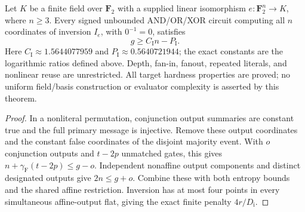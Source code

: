 \begin{theorem}
  \label{thm:lowerbounds-algebraic-geometry-inversion-fiber}
  \leanok
  Let $K$ be a finite field over $\mathbf F_2$ with a supplied linear
  isomorphism $e:\mathbf F_2^n\longrightarrow K$, where $n\ge3$.
  Every signed unbounded AND/OR/XOR circuit computing all $n$ coordinates
  of inversion $I_e$, with $0^{-1}=0$, satisfies
  \[
    g\ge C_{\mathrm I}n-P_{\mathrm I}.
  \]
  Here $C_{\mathrm I}\approx1.5644077959$ and
  $P_{\mathrm I}\approx0.5640721944$; the exact constants are the logarithmic
  ratios defined above. Depth,
  fan-in, fanout, repeated literals, and nonlinear reuse are unrestricted.
  All target hardness properties are proved; no uniform field/basis
  construction or evaluator complexity is asserted by this theorem.
\end{theorem}
\begin{proof}
  \leanok
  In a nonliteral permutation, conjunction output summaries are constant true
  and the full primary message is injective. Remove these output coordinates
  and the constant false coordinates of the disjoint majority event. With $o$
  conjunction outputs and $t-2p$ unmatched gates, this gives
  $n+\gamma_{\mathrm F}(t-2p)\le g-o$. Independent nonaffine output components
  and distinct designated outputs give $2n\le g+o$. Combine these with both
  entropy bounds and the shared affine restriction. Inversion has at most
  four points in every simultaneous affine-output flat, giving the exact
  finite penalty $4r/D_{\mathrm i}$.
\end{proof}

